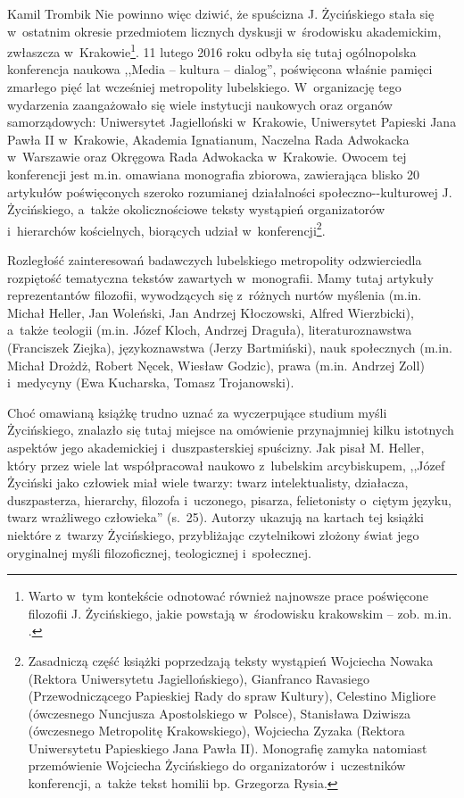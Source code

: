 \begin{recplenv}{Kamil Trombik}
Nie powinno więc dziwić, że spuścizna J. Życińskiego stała się w~ostatnim okresie przedmiotem licznych dyskusji w~środowisku akademickim, zwłaszcza w~Krakowie\footnote{Warto w~tym kontekście odnotować również najnowsze prace poświęcone filozofii J. Życińskiego, jakie powstają w~środowisku krakowskim -- zob. m.in.
\parencites[][]{liana_nauka_2019}[][]{liana_2020}.%
}. 11 lutego 2016 roku odbyła się tutaj ogólnopolska konferencja naukowa ,,Media -- kultura -- dialog'', poświęcona właśnie pamięci zmarłego pięć lat wcześniej metropolity lubelskiego. W~organizację tego wydarzenia zaangażowało się wiele instytucji naukowych oraz organów samorządowych: Uniwersytet Jagielloński w~Krakowie, Uniwersytet Papieski Jana Pawła II w~Krakowie, Akademia Ignatianum, Naczelna Rada Adwokacka w~Warszawie oraz Okręgowa Rada Adwokacka w~Krakowie. Owocem tej konferencji jest m.in. omawiana monografia zbiorowa, zawierająca blisko 20 artykułów poświęconych szeroko rozumianej działalności społeczno-\mbox{-kulturowej} J. Życińskiego, a~także okolicznościowe teksty wystąpień organizatorów i~hierarchów kościelnych, biorących udział w~konferencji\footnote{Zasadniczą część książki poprzedzają teksty wystąpień Wojciecha Nowaka (Rektora Uniwersytetu Jagiellońskiego), Gianfranco Ravasiego (Przewodniczącego Papieskiej Rady do spraw Kultury), Celestino Migliore (ówczesnego Nuncjusza Apostolskiego w~Polsce), Stanisława Dziwisza (ówczesnego Metropolitę Krakowskiego), Wojciecha Zyzaka (Rektora Uniwersytetu Papieskiego Jana Pawła II). Monografię zamyka natomiast przemówienie Wojciecha Życińskiego do organizatorów i~uczestników konferencji, a~także tekst homilii bp. Grzegorza Rysia.}.

\enlargethispage{-1\baselineskip}
Rozległość zainteresowań badawczych lubelskiego metropolity odzwierciedla rozpiętość tematyczna tekstów zawartych w~monografii. Mamy tutaj artykuły reprezentantów filozofii, wywodzących się z~różnych nurtów myślenia (m.in. Michał Heller, Jan Woleński, Jan Andrzej Kłoczowski, Alfred Wierzbicki), a~także teologii (m.in. Józef Kloch, Andrzej Draguła), literaturoznawstwa (Franciszek Ziejka), językoznawstwa (Jerzy Bartmiński), nauk społecznych (m.in. Michał Drożdż, Robert Nęcek, Wiesław Godzic), prawa (m.in. Andrzej Zoll) i~medycyny (Ewa Kucharska, Tomasz Trojanowski).

Choć omawianą książkę trudno uznać za wyczerpujące studium myśli Życińskiego, znalazło się tutaj miejsce na omówienie przynajmniej kilku istotnych aspektów jego akademickiej i~duszpasterskiej spuścizny. Jak pisał M. Heller, który przez wiele lat współpracował naukowo z~lubelskim arcybiskupem, ,,Józef Życiński jako człowiek miał wiele twarzy: twarz intelektualisty, działacza, duszpasterza, hierarchy, filozofa i~uczonego, pisarza, felietonisty o~ciętym języku, twarz wrażliwego człowieka'' (s.~25). Autorzy ukazują na kartach tej książki niektóre z~twarzy Życińskiego, przybliżając czytelnikowi złożony świat jego oryginalnej myśli filozoficznej, teologicznej i~społecznej.


\end{recplenv}

